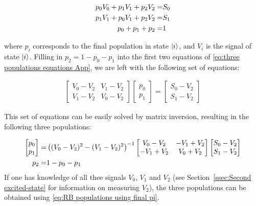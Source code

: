       \begin{align}
        p_0 V_0 + p_1 V_1 + p_2 V_2 = & S_0 \notag\\
        p_1 V_1 + p_0 V_1 + p_2 V_2 = & S_1 \notag\\
        p_0 + p_1 + p_2 = &   1
        \label{eq:three populations equations App}
      \end{align}

      where $p_i$ corresponds to the final population in state $\ket{i}$, and $V_i$ is the signal of state $\ket{i}$.  Filling in $p_2 = 1 - p_0 - p_1$ into the first two equations of \ref{eq:three populations equations App}, we are left with the following set of equations:

      \begin{align}
        \begin{bmatrix}
          V_0 - V_2 & V_1 - V_2 \\
          V_1 - V_2 & V_0 - V_2
        \end{bmatrix}
        \begin{bmatrix}
          p_0 \\
          p_1
        \end{bmatrix}
        =
        \begin{bmatrix}
          S_0 - V_2 \\
          S_1 - V_2
        \end{bmatrix}
      \end{align}

      This set of equations can be easily solved by matrix inversion, resulting in the following three populations:

      \begin{align}
        \begin{bmatrix}
          p_0 \\
          p_1
        \end{bmatrix}
        = &
        \left((V_0-V_2)^2 - (V_1 - V_2)^2\right)^{-1}
        \begin{bmatrix}
          V_0 - V_2 & -V_1 + V_2 \\
          -V_1 + V_2 & V_0 + V_2
        \end{bmatrix}
        \begin{bmatrix}
          S_0 - V_2 \\
          S_1 - V_2
        \end{bmatrix} \notag\\
        p_2 = & 1 - p_0 - p_1
        \label{eq:RB populations using final pi}
      \end{align}
      If one has knowledge of all thee signals $V_0$, $V_1$ and $V_2$ (see Section~\ref{ssec:Second excited-state} for information on measuring $V_2$), the three populations can be obtained using \ref{eq:RB populations using final pi}.

